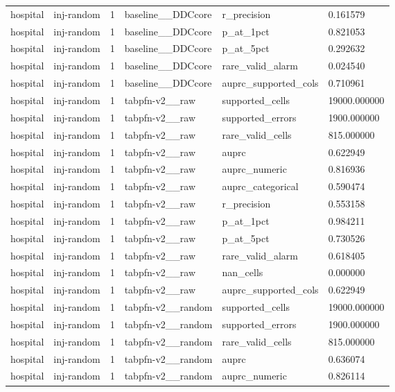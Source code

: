 \begin{tabular}{llllll}
hospital & inj-random & 1 & baseline\_\_DDCcore & r\_precision & 0.161579 \\
hospital & inj-random & 1 & baseline\_\_DDCcore & p\_at\_1pct & 0.821053 \\
hospital & inj-random & 1 & baseline\_\_DDCcore & p\_at\_5pct & 0.292632 \\
hospital & inj-random & 1 & baseline\_\_DDCcore & rare\_valid\_alarm & 0.024540 \\
hospital & inj-random & 1 & baseline\_\_DDCcore & auprc\_supported\_cols & 0.710961 \\
hospital & inj-random & 1 & tabpfn-v2\_\_raw & supported\_cells & 19000.000000 \\
hospital & inj-random & 1 & tabpfn-v2\_\_raw & supported\_errors & 1900.000000 \\
hospital & inj-random & 1 & tabpfn-v2\_\_raw & rare\_valid\_cells & 815.000000 \\
hospital & inj-random & 1 & tabpfn-v2\_\_raw & auprc & 0.622949 \\
hospital & inj-random & 1 & tabpfn-v2\_\_raw & auprc\_numeric & 0.816936 \\
hospital & inj-random & 1 & tabpfn-v2\_\_raw & auprc\_categorical & 0.590474 \\
hospital & inj-random & 1 & tabpfn-v2\_\_raw & r\_precision & 0.553158 \\
hospital & inj-random & 1 & tabpfn-v2\_\_raw & p\_at\_1pct & 0.984211 \\
hospital & inj-random & 1 & tabpfn-v2\_\_raw & p\_at\_5pct & 0.730526 \\
hospital & inj-random & 1 & tabpfn-v2\_\_raw & rare\_valid\_alarm & 0.618405 \\
hospital & inj-random & 1 & tabpfn-v2\_\_raw & nan\_cells & 0.000000 \\
hospital & inj-random & 1 & tabpfn-v2\_\_raw & auprc\_supported\_cols & 0.622949 \\
hospital & inj-random & 1 & tabpfn-v2\_\_random & supported\_cells & 19000.000000 \\
hospital & inj-random & 1 & tabpfn-v2\_\_random & supported\_errors & 1900.000000 \\
hospital & inj-random & 1 & tabpfn-v2\_\_random & rare\_valid\_cells & 815.000000 \\
hospital & inj-random & 1 & tabpfn-v2\_\_random & auprc & 0.636074 \\
hospital & inj-random & 1 & tabpfn-v2\_\_random & auprc\_numeric & 0.826114 \\

\end{tabular}
